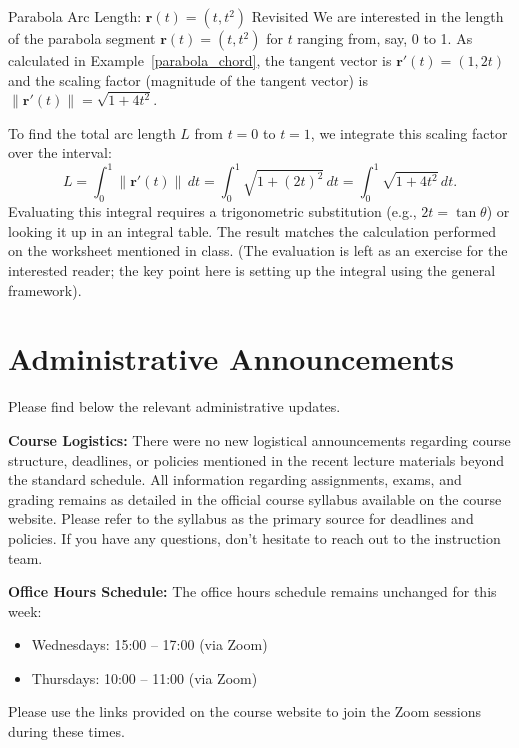 \documentclass[12pt]{article}
\theoremstyle{definition} %
\theoremstyle{plain} %
\theoremstyle{remark} %
\begin{document}
\begin{example}{{Parabola Arc Length: $\mathbf{r}(t) = (t, t^2)$ Revisited}}
We are interested in the length of the parabola segment $\mathbf{r}(t) = (t, t^2)$ for $t$ ranging from, say, 0 to 1.
As calculated in Example~\ref{parabola_chord}, the tangent vector is $\mathbf{r}'(t) = (1, 2t)$ and the scaling factor (magnitude of the tangent vector) is $\|\mathbf{r}'(t)\| = \sqrt{1+4t^2}$.

To find the total arc length $L$ from $t=0$ to $t=1$, we integrate this scaling factor over the interval:
\[
    L = \int_{0}^{1} \|\mathbf{r}'(t)\| \, dt = \int_{0}^{1} \sqrt{1 + (2t)^2} \, dt = \int_{0}^{1} \sqrt{1+4t^2} \, dt.
\]
Evaluating this integral requires a trigonometric substitution (e.g., $2t = \tan \theta$) or looking it up in an integral table. The result matches the calculation performed on the worksheet mentioned in class. (The evaluation is left as an exercise for the interested reader; the key point here is setting up the integral using the general framework).
\end{example}


\newpage %
\section*{Administrative Announcements}

Please find below the relevant administrative updates.

\begin{adminnote}
    \textbf{Course Logistics:} There were no new logistical announcements regarding course structure, deadlines, or policies mentioned in the recent lecture materials beyond the standard schedule. All information regarding assignments, exams, and grading remains as detailed in the official course syllabus available on the course website. Please refer to the syllabus as the primary source for deadlines and policies. If you have any questions, don't hesitate to reach out to the instruction team.
\end{adminnote}

\begin{adminnote}
    \textbf{Office Hours Schedule:} The office hours schedule remains unchanged for this week:
    \begin{itemize}
        \item Wednesdays: 15:00 – 17:00 (via Zoom)
        \item Thursdays: 10:00 – 11:00 (via Zoom)
    \end{itemize}
    Please use the links provided on the course website to join the Zoom sessions during these times.
\end{adminnote}

\clearpage %
\end{document}
